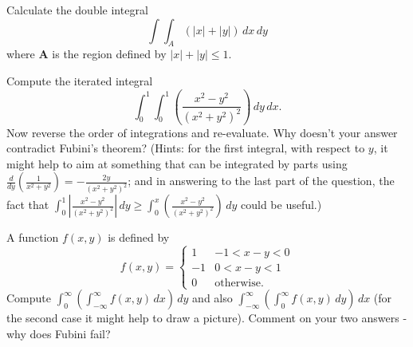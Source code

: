 
\setcounter{question}{69}
\question Calculate the double integral
\[
    \int\int_A \left(\lvert x \rvert + \lvert y \rvert\right) \,dx\,dy
\]
where $\bm A$ is the region defined by $\lvert x \rvert + \lvert y \rvert \leq 1$.

\setcounter{question}{72}
\question Compute the iterated integral
\[
    \int_0^1 \int_0^1 \left( \frac{x^2 - y^2}{(x^2 + y^2)^2} \right) \,dy\,dx.
\]
Now reverse the order of integrations and re-evaluate.
Why doesn't your answer contradict Fubini's theorem?
(Hints: for the first integral, with respect to $y$,
it might help to aim at something that can be integrated by parts
using $\frac{d}{dy}\left(\frac{1}{x^2+y^2}\right)=-\frac{2y}{(x^2+y^2)^2}$;
and in answering to the last part of the question, the fact that 
$\int_0^1\left\lvert\frac{x^2-y^2}{(x^2+y^2)^2}\right\rvert\,dy \geq
    \int_0^x\left(\frac{x^2-y^2}{(x^2+y^2)^2}\right)\,dy$
could be useful.)

\setcounter{question}{74}
\question A function $f(x, y)$ is defined by
\[
    f(x,y)=
    \begin{cases}
        1 & -1 < x-y < 0 \\
        -1 & 0 < x-y < 1 \\
        0 & \text{otherwise}.
    \end{cases}
\]
Compute 
$\int_0^\infty \left(\int_{-\infty}^\infty f(x,y) \,dx\right)\,dy$
and also
$\int_{-\infty}^\infty \left(\int_0^\infty f(x, y)\,dy\right)\,dx$
(for the second case it might help to draw a picture).
Comment on your two answers - why does Fubini fail?
